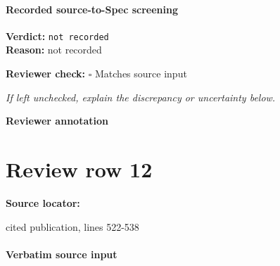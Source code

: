 \documentclass[10pt]{article}
\newcommand{\reviewerbox}{%
  \par\noindent\fbox{\parbox{0.96\linewidth}{\rule{0pt}{0.38in}}}\par
}
\newcommand{\reviewmatch}[1]{%
  \par\noindent\textbf{Reviewer check:} $\square$\; #1\par
  \noindent\emph{If left unchecked, explain the discrepancy or uncertainty below.}\par
}
\begin{document}
\paragraph{Recorded source-to-Spec screening}
\textbf{Verdict:} \texttt{not recorded}
\\
\textbf{Reason:} not recorded
\reviewmatch{Matches source input}
\noindent\textbf{Reviewer annotation}\par
\reviewerbox
\clearpage
\hypertarget{source-claim-6a7da73327f0abda}{}
\section*{Review row 12}
\textbf{Source locator:} {\footnotesize\raggedright cited publication, lines 522-\allowbreak{}538\par}
\paragraph{Verbatim source input}
\end{document}
